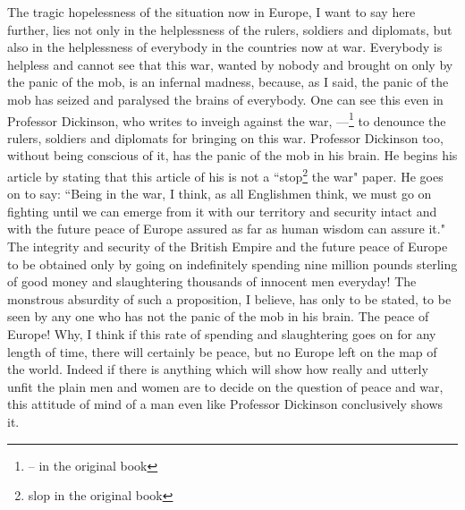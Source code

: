 The tragic hopelessness of the situation now in Europe, I want to say here further, lies not only in the helplessness of the rulers, soldiers and diplomats, but also in the helplessness of everybody in the countries now at war.
Everybody is helpless and cannot see that this war, wanted by nobody and brought on only by the panic of the mob, is an infernal madness, because, as I said, the panic of the mob has seized and paralysed the brains of everybody.
One can see this even in Professor Dickinson, who writes to inveigh against the war, ---\footnote{-- in the original book} to denounce the rulers, soldiers and diplomats for bringing on this war.
Professor Dickinson too, without being conscious of it, has the panic of the mob in his brain.
He begins his article by stating that this article of his is not a ``stop\footnote{slop in the original book} the war" paper.
He goes on to say: ``Being in the war, I think, as all Englishmen think, we must go on fighting until we can emerge from it with our territory and security intact and with the future peace of Europe assured as far as human wisdom can assure it."
The integrity and security of the British Empire and the future peace of Europe to be obtained only by going on indefinitely spending nine million pounds sterling of good money and slaughtering thousands of innocent men everyday!
The monstrous absurdity of such a proposition, I believe, has only to be stated, to be seen by any one who has not the panic of the mob in his brain.
The peace of Europe!
Why, I think if this rate of spending and slaughtering goes on for any length of time, there will certainly be peace, but no Europe left on the map of the world.
Indeed if there is anything which will show how really and utterly unfit the plain men and women are to decide on the question of peace and war, this attitude of mind of a man even like Professor Dickinson conclusively shows it.

